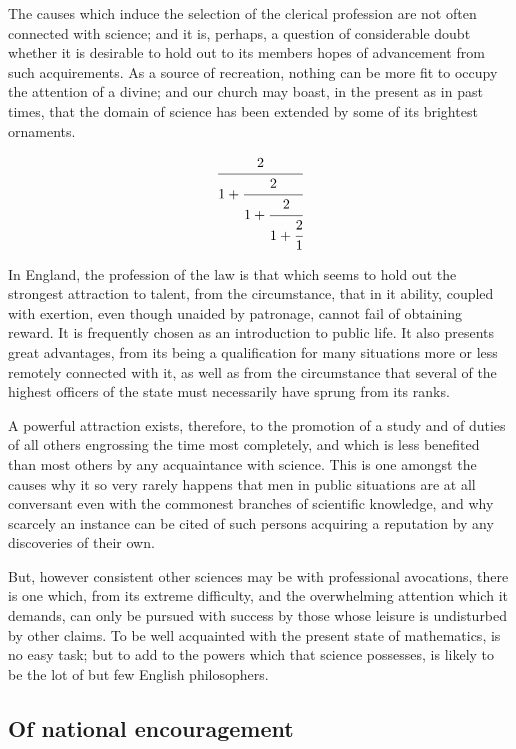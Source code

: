 \documentclass{aa}
\begin{document}
The causes which induce the selection of the clerical profession are
not often connected with science; and it is, perhaps, a question of
considerable doubt whether it is desirable to hold out to its members
hopes of advancement from such acquirements. As a source of recreation,
nothing can be more fit to occupy the attention of a divine; and our
church may boast, in the present as in past times, that the domain of
science has been extended by some of its brightest ornaments.


\begin{equation}
    \cfrac{2}{1 + \cfrac{2}{1 + \cfrac{2}{1 + \cfrac{2}{1}}}}
    \label{Fracao}
\end{equation}


In England, the profession of the law is that which seems to hold out
the strongest attraction to talent, from the circumstance, that in it
ability, coupled with exertion, even though unaided by patronage, cannot
fail of obtaining reward. It is frequently chosen as an introduction
to public life. It also presents great advantages, from its being a
qualification for many situations more or less remotely connected
with it, as well as from the circumstance that several of the highest
officers of the state must necessarily have sprung from its ranks.

A powerful attraction exists, therefore, to the promotion of a study and
of duties of all others engrossing the time most completely, and which
is less benefited than most others by any acquaintance with science.
This is one amongst the causes why it so very rarely happens that men in
public situations are at all conversant even with the commonest branches
of scientific knowledge, and why scarcely an instance can be cited of
such persons acquiring a reputation by any discoveries of their own.

But, however consistent other sciences may be with professional
avocations, there is one which, from its extreme difficulty, and the
overwhelming attention which it demands, can only be pursued with
success by those whose leisure is undisturbed by other claims. To be
well acquainted with the present state of mathematics, is no easy task;
but to add to the powers which that science possesses, is likely to be
the lot of but few English philosophers.

\subsection{Of national encouragement}
\end{document}
